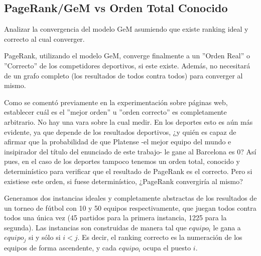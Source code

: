 \subsection{PageRank/GeM vs Orden Total Conocido}
\label{subsec:exp5}
\begin{LaTeXdescription}
    \item[Objetivo] Analizar la convergencia del modelo GeM asumiendo que
        existe ranking ideal y correcto al cual converger.\\

    \item[Hip\'otesis] PageRank, utilizando el modelo GeM, converge finalmente a
        un ''Orden Real'' o ''Correcto'' de los competidores deportivos, si este existe.
        Adem\'as, no necesitar\'a de un grafo completo (los resultados de todos
        contra todos) para converger al mismo.\\

    \item[Proposici\'on] Como se coment\'o previamente en la experimentaci\'on
        sobre p\'aginas web, establecer cuál es el ''mejor orden'' u ''orden
        correcto'' es completamente arbitrario. No hay una vara sobre la cual
        medir. En los deportes esto es a\'un más evidente, ya que depende de
        los resultados deportivos, ¿y qui\'en es capaz de afirmar que la
        probabilidad de que Platense -el mejor equipo del mundo e insipirador
        del t\'itulo del enunciado de este trabajo- le gane al Barcelona es $0$?
        As\'i pues, en el caso de los deportes tampoco tenemos un orden total,
        conocido y determin\'istico para verificar que el resultado de PageRank
        es el correcto. Pero si existiese este orden, si fuese determin\'istico,
        ¿PageRank convergir\'ia al mismo?\\

    \item[M\'etodo de Experimentaci\'on] Generamos dos instancias ideales y
        completamente abstractas de los resultados de un torneo de f\'utbol con
        10 y 50 equipos respectivamente, que juegan todos contra todos una
        \'unica vez (45 partidos para la primera instancia, 1225 para la
        segunda). Las instancias son construidas de manera tal que $equipo_i$ le
        gana a $equipo_j$ si y s\'olo si $i<j$. Es decir, el ranking correcto es
        la numeraci\'on de los equipos de forma ascendente, y cada $equipo_i$
        ocupa el puesto $i$.


\end{LaTeXdescription}
